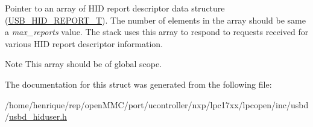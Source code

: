 Pointer to an array of H\-I\-D report descriptor data structure (\hyperlink{group__USBD__HID_gaaa1686adb431783ea4357e6899c0d39d}{U\-S\-B\-\_\-\-H\-I\-D\-\_\-\-R\-E\-P\-O\-R\-T\-\_\-\-T}). The number of elements in the array should be same a {\itshape max\-\_\-reports} value. The stack uses this array to respond to requests received for various H\-I\-D report descriptor information. \begin{DoxyNote}{Note}
This array should be of global scope. 
\end{DoxyNote}


The documentation for this struct was generated from the following file\-:\begin{DoxyCompactItemize}
\item 
/home/henrique/rep/open\-M\-M\-C/port/ucontroller/nxp/lpc17xx/lpcopen/inc/usbd/\hyperlink{usbd__hiduser_8h}{usbd\-\_\-hiduser.\-h}\end{DoxyCompactItemize}
